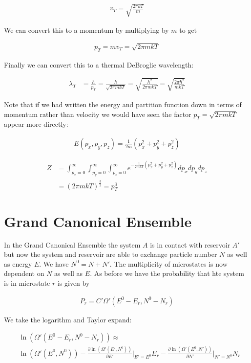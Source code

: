 \documentclass[12pt]{article}
\begin{document}
\begin{align}
v_T = \sqrt{\frac{2\pi kT}{m}}
\end{align}

 We can convert this to a momentum by multiplying by $m$ to get
 
 \begin{align}
 p_T = m v_T = \sqrt{2\pi mkT}
 \end{align}
 
 Finally we can convert this to a thermal DeBroglie wavelength:
 
\begin{align}
\lambda_T &= \frac{h}{p_T} = \frac{h}{\sqrt{2\pi m kT}} = \sqrt{\frac{h^2}{2\pi mkT}} = \sqrt{\frac{2\pi \hbar^2}{mkT}}
\end{align}

Note that if we had written the energy and partition function down in terms of momentum rather than velocity we would have seen the factor $p_T = \sqrt{2\pi mkT}$ appear more directly:

\begin{align}
E(p_x,p_y,p_z) = \frac{1}{2m}(p_x^2+p_y^2+p_z^2)
\end{align}

\begin{align}
Z &= \int_{p_x=0}^{\infty}\int_{p_y=0}^{\infty} \int_{p_z=0}^{\infty} e^{-\frac{1}{2m k T} (p_x^2 + p_y^2+ p_z^2)} dp_x dp_y dp_z\\
&= \left(2\pi m k T\right)^{\frac{3}{2}} = p_T^3
\end{align}

\section{Grand Canonical Ensemble}

In the Grand Canonical Ensemble the system $A$ is in contact with reservoir $A'$ but now the system and reservoir are able to exchange particle number $N$ as well as energy $E$. We have $N^0 = N+N'$. The multiplicity of microstates is now dependent on $N$ as well as $E$. As before we have the probability that hte system is in microstate $r$ is given by

\begin{align}
P_r = C' \Omega'(E^0-E_r, N^0 - N_r)
\end{align}

We take the logarithm and Taylor expand:

\begin{align}
&\ln(\Omega'(E^0-E_r,N^0-N_r)) \approx\\ 
&\ln(\Omega'(E^0,N^0)) - \frac{\partial \ln(\Omega'(E',N^0))}{\partial E'}\rvert_{E'=E^0} E_r - \frac{\partial\ln(\Omega'(E^0,N'))}{\partial N'}\rvert_{N'=N^0} N_r
\end{align}
\end{document}
